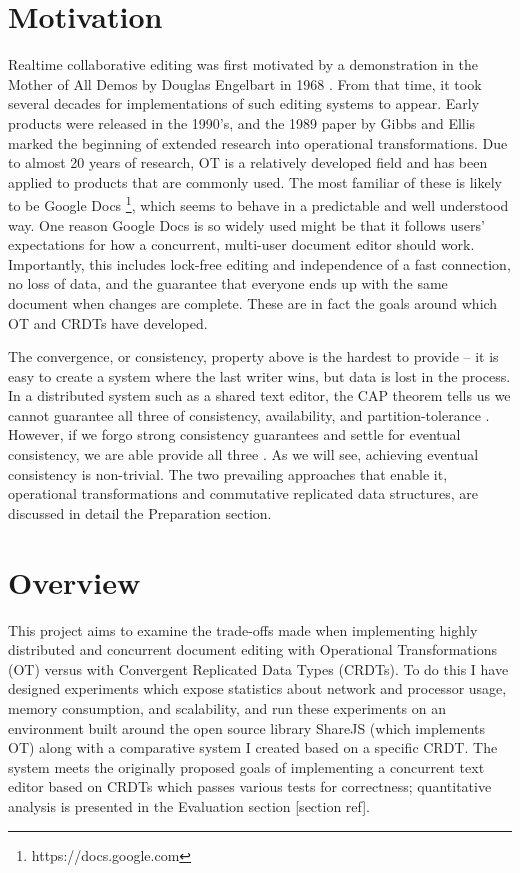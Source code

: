 \documentclass[12pt,a4paper,twoside,openright]{report}
\begin{document}
\section{Motivation}

Realtime collaborative editing was first motivated by a demonstration in the Mother of All Demos by Douglas Engelbart in 1968 \cite{MotherDemo}. From that time, it took several decades for implementations of such editing systems to appear. Early products were released in the 1990's, and the 1989 paper by Gibbs and Ellis \cite{Ellis1989} marked the beginning of extended research into operational transformations. Due to almost 20 years of research, OT is a relatively developed field and has been applied to products that are commonly used. The most familiar of these is likely to be Google Docs \footnote{https://docs.google.com}, which seems to behave in a predictable and well understood way. One reason Google Docs is so widely used might be that it follows users' expectations for how a concurrent, multi-user document editor should work. Importantly, this includes lock-free editing and independence of a fast connection, no loss of data, and the guarantee that everyone ends up with the same document when changes are complete. These are in fact the goals around which OT and CRDTs have developed.

The convergence, or consistency, property above is the hardest to provide -- it is easy to create a system where the last writer wins, but data is lost in the process. In a distributed system such as a shared text editor, the CAP theorem tells us we cannot guarantee all three of consistency, availability, and partition-tolerance \cite{Gilbert2005}. However, if we forgo strong consistency guarantees and settle for eventual consistency, we are able provide all three \cite{zeller2014}. As we will see, achieving eventual consistency is non-trivial. The two prevailing approaches that enable it, operational transformations and commutative replicated data structures, are discussed in detail the Preparation section.


\section{Overview}
This project aims to examine the trade-offs made when implementing highly distributed and concurrent document editing with Operational Transformations (OT) versus with Convergent Replicated Data Types (CRDTs). To do this I have designed experiments which expose statistics about network and processor usage, memory consumption, and scalability, and run these experiments on an environment built around the open source library ShareJS (which implements OT) along with a comparative system I created based on a specific CRDT. The system meets the originally proposed goals of implementing a concurrent text editor based on CRDTs which passes various tests for correctness; quantitative analysis is presented in the Evaluation section [section ref].
\end{document}
